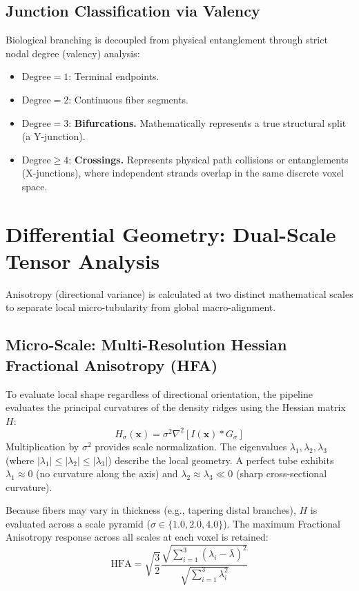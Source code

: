 \documentclass[11pt, a4paper]{article}
\begin{document}
\subsection{Junction Classification via Valency}
Biological branching is decoupled from physical entanglement through strict nodal degree (valency) analysis:
\begin{itemize}
    \item $\text{Degree} = 1$: Terminal endpoints.
    \item $\text{Degree} = 2$: Continuous fiber segments.
    \item $\text{Degree} = 3$: \textbf{Bifurcations.} Mathematically represents a true structural split (a Y-junction).
    \item $\text{Degree} \ge 4$: \textbf{Crossings.} Represents physical path collisions or entanglements (X-junctions), where independent strands overlap in the same discrete voxel space.
\end{itemize}

\section{Differential Geometry: Dual-Scale Tensor Analysis}
Anisotropy (directional variance) is calculated at two distinct mathematical scales to separate local micro-tubularity from global macro-alignment.

\subsection{Micro-Scale: Multi-Resolution Hessian Fractional Anisotropy (HFA)}
To evaluate local shape regardless of directional orientation, the pipeline evaluates the principal curvatures of the density ridges using the Hessian matrix $H$:
\begin{equation}
    H_{\sigma}(\bm{x}) = \sigma^2 \nabla^2 \left[ I(\bm{x}) * G_{\sigma} \right]
\end{equation}
Multiplication by $\sigma^2$ provides scale normalization. The eigenvalues $\lambda_1, \lambda_2, \lambda_3$ (where $|\lambda_1| \le |\lambda_2| \le |\lambda_3|$) describe the local geometry. A perfect tube exhibits $\lambda_1 \approx 0$ (no curvature along the axis) and $\lambda_2 \approx \lambda_3 \ll 0$ (sharp cross-sectional curvature).

Because fibers may vary in thickness (e.g., tapering distal branches), $H$ is evaluated across a scale pyramid ($\sigma \in \{1.0, 2.0, 4.0\}$). The maximum Fractional Anisotropy response across all scales at each voxel is retained:
\begin{equation}
    \text{HFA} = \sqrt{\frac{3}{2}} \frac{\sqrt{\sum_{i=1}^3 (\lambda_i - \bar{\lambda})^2}}{\sqrt{\sum_{i=1}^3 \lambda_i^2}}
\end{equation}
\end{document}
